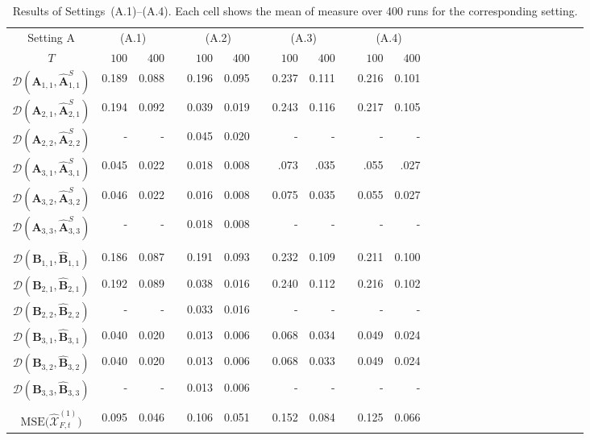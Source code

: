 \documentclass[aos]{imsart}
\theoremstyle{plain}
\theoremstyle{definition}
\def\wh#1{\widehat{#1}}
\def\cD{\mathcal{D}}
\def\cX{\mathcal{X}}
\def\bA{\mathbf{A}}
\def\bB{\mathbf{B}}
\begin{document}
\begin{table}%
\caption{Results of Settings~(A.1)--(A.4). Each cell shows the mean of measure over 400 runs for the corresponding setting.}
\label{tab: simulation_setting_A}
\begin{tabular}{@{}crrrrrrrrrrrrrrrrrrrrrrrrr@{}}
\hline %
Setting A & \multicolumn{2}{c}{(A.1)} && \multicolumn{2}{c}{(A.2)} && \multicolumn{2}{c}{(A.3)} && \multicolumn{2}{c}{(A.4)}  \\
$T$
&  $100$ & $400$ && $100$ & $400$ && $100$ & $400$
&& $100$ & $400$ \\
\hline %
$\cD(\bA_{1,1}, \wh{\bA}_{1,1}^S)$ &  0.189 & 0.088 && 0.196 & 0.095  && 0.237 & 0.111 && 0.216 & 0.101  \\
$\cD(\bA_{2,1}, \wh{\bA}_{2,1}^S)$ &  0.194 & 0.092 && 0.039 & 0.019  && 0.243 & 0.116 && 0.217 & 0.105 \\
$\cD(\bA_{2,2}, \wh{\bA}_{2,2}^S)$ &  - & - && 0.045 & 0.020  && - & - && - & -  \\
$\cD(\bA_{3,1}, \wh{\bA}_{3,1}^S)$ &  0.045 & 0.022 && 0.018 & 0.008  && .073 & .035 && .055 & .027 \\
$\cD(\bA_{3,2}, \wh{\bA}_{3,2}^S)$ &  0.046 & 0.022 && 0.016 & 0.008  && 0.075 & 0.035 && 0.055 & 0.027 \\
$\cD(\bA_{3,3}, \wh{\bA}_{3,3}^S)$ &  - & - && 0.018 & 0.008  && - & - && - & -  \\
\\
$\cD(\bB_{1,1}, \wh{\bB}_{1,1})$ &  0.186 & 0.087 && 0.191 & 0.093  && 0.232 & 0.109 && 0.211 & 0.100  \\
$\cD(\bB_{2,1}, \wh{\bB}_{2,1})$ &  0.192 & 0.089 && 0.038 & 0.016  && 0.240 & 0.112 && 0.216 & 0.102 \\
$\cD(\bB_{2,2}, \wh{\bB}_{2,2})$ &  - & - && 0.033 & 0.016  && - & - && - & -  \\
$\cD(\bB_{3,1}, \wh{\bB}_{3,1})$ &  0.040 & 0.020 && 0.013 & 0.006  && 0.068 & 0.034 && 0.049 & 0.024 \\
$\cD(\bB_{3,2}, \wh{\bB}_{3,2})$ &  0.040 & 0.020 && 0.013 & 0.006  && 0.068 & 0.033 && 0.049 & 0.024 \\
$\cD(\bB_{3,3}, \wh{\bB}_{3,3})$ &  - & - && 0.013 & 0.006  && - & - && - & -   \\
\\
$\text{MSE}\big(\wh\cX_{F,t}^{(1)} \big)$ &  0.095 & 0.046 && 0.106 & 0.051  && 0.152 & 0.084 && 0.125 & 0.066  \\

\end{tabular}
\end{table}
\end{document}
